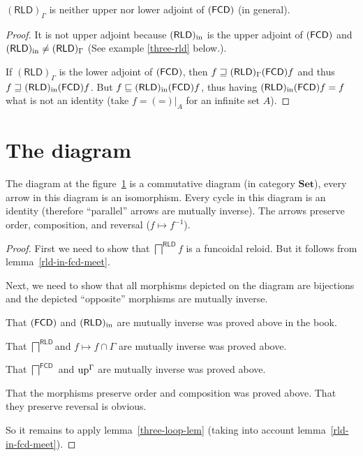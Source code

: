 \begin{prop}
$(\mathsf{RLD})_{\Gamma}$ is neither upper nor lower adjoint of $(\mathsf{FCD})$
(in general).\end{prop}
\begin{proof}
It is not upper adjoint because $(\mathsf{RLD})_{\mathrm{in}}$ is the upper adjoint of
$(\mathsf{FCD})$ and $(\mathsf{RLD})_{\mathrm{in}}\neq(\mathsf{RLD})_{\Gamma}$ (See example
\ref{three-rld} below.).

If $(\mathsf{RLD})_{\Gamma}$ is the lower adjoint of $(\mathsf{FCD})$, then
$f\sqsupseteq(\mathsf{RLD})_{\Gamma}(\mathsf{FCD}) f$ and thus $f\sqsupseteq(\mathsf{RLD})_{\mathrm{in}}(\mathsf{FCD}) f$.
But $f\sqsubseteq(\mathsf{RLD})_{\mathrm{in}}(\mathsf{FCD}) f$, thus having $(\mathsf{RLD})_{\mathrm{in}}(\mathsf{FCD}) f=f$
what is not an identity (take $f={(\mathord{=})}|_{A}$ for an infinite
set $A$).
\end{proof}

\section{The diagram}
\begin{thm}
\label{fcd-diagram}The diagram at the figure~\ref{gamma-dia} is
a commutative diagram (in category $\mathbf{Set}$), every arrow in
this diagram is an isomorphism. Every cycle in this diagram is an
identity (therefore ``parallel'' arrows are mutually inverse). The
arrows preserve order, composition, and reversal ($f\mapsto f^{-1}$).

\begin{figure}[ht]
\caption{\label{gamma-dia}}


\end{figure}
\end{thm}
\begin{proof}
First we need to show that $\bigsqcap^{\mathsf{RLD}}f$ is a funcoidal
reloid. But it follows from lemma~\ref{rld-in-fcd-meet}.

Next, we need to show that all morphisms depicted on the diagram are
bijections and the depicted ``opposite'' morphisms are mutually
inverse.

That $(\mathsf{FCD})$ and $(\mathsf{RLD})_{\mathrm{in}}$ are mutually inverse was proved above
in the book.

That $\bigsqcap^{\mathsf{RLD}}$and $f\mapsto f\cap\Gamma$ are mutually
inverse was proved above.

That $\bigsqcap^{\mathsf{FCD}}$ and $\operatorname{up}^{\Gamma}$ are mutually
inverse was proved above.

That the morphisms preserve order and composition was proved above.
That they preserve reversal is obvious.

So it remains to apply lemma~\ref{three-loop-lem} (taking into account
lemma~\ref{rld-in-fcd-meet}).
\end{proof}

